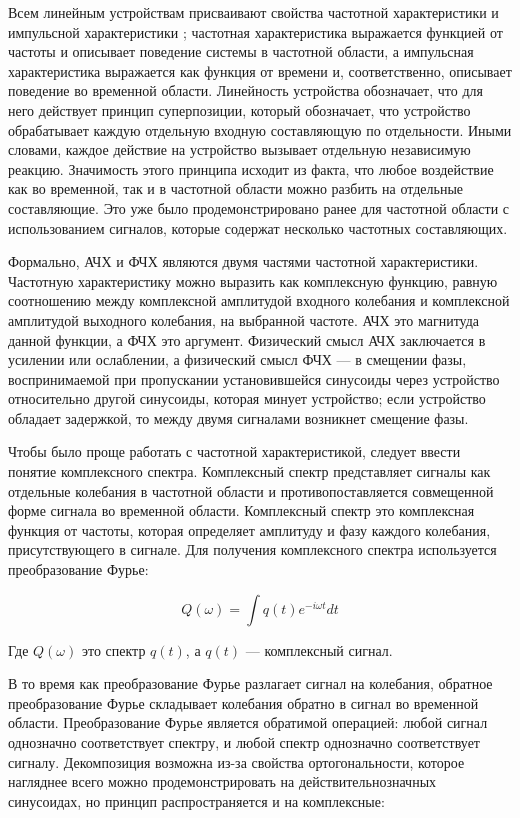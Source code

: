 \documentclass{report}
\begin{document}
Всем линейным устройствам присваивают свойства частотной характеристики и импульсной характеристики \cite{linear_systems}; частотная характеристика выражается функцией от частоты и описывает поведение системы в частотной области, а импульсная характеристика выражается как функция от времени и, соответственно, описывает поведение во временной области. Линейность устройства обозначает, что для него действует принцип суперпозиции, который обозначает, что устройство обрабатывает каждую отдельную входную составляющую по отдельности. Иными словами, каждое действие на устройство вызывает отдельную независимую реакцию. Значимость этого принципа исходит из факта, что любое воздействие как во временной, так и в частотной области можно разбить на отдельные составляющие. Это уже было продемонстрировано ранее для частотной области с использованием сигналов, которые содержат несколько частотных составляющих.

Формально, АЧХ и ФЧХ являются двумя частями частотной характеристики. Частотную характеристику можно выразить как комплексную функцию, равную соотношению между комплексной амплитудой входного колебания и комплексной амплитудой выходного колебания, на выбранной частоте. АЧХ это магнитуда данной функции, а ФЧХ это аргумент. Физический смысл АЧХ заключается в усилении или ослаблении, а физический смысл ФЧХ --- в смещении фазы, воспринимаемой при пропускании установившейся синусоиды через устройство относительно другой синусоиды, которая минует устройство; если устройство обладает задержкой, то между двумя сигналами возникнет смещение фазы.

Чтобы было проще работать с частотной характеристикой, следует ввести понятие комплексного спектра. Комплексный спектр представляет сигналы как отдельные колебания в частотной области и противопоставляется совмещенной форме сигнала во временной области. Комплексный спектр это комплексная функция от частоты, которая определяет амплитуду и фазу каждого колебания, присутствующего в сигнале. Для получения комплексного спектра используется преобразование Фурье:

\begin{equation}
Q(\omega) = \int q(t) e^{-i \omega t} dt
\end{equation}

Где $Q(\omega)$ это спектр $q(t)$, а $q(t)$ --- комплексный сигнал.

В то время как преобразование Фурье разлагает сигнал на колебания, обратное преобразование Фурье складывает колебания обратно в сигнал во временной области. Преобразование Фурье является обратимой операцией: любой сигнал однозначно соответствует спектру, и любой спектр однозначно соответствует сигналу. Декомпозиция возможна из-за свойства ортогональности, которое нагляднее всего можно продемонстрировать на действительнозначных синусоидах, но принцип распространяется и на комплексные:
\end{document}
